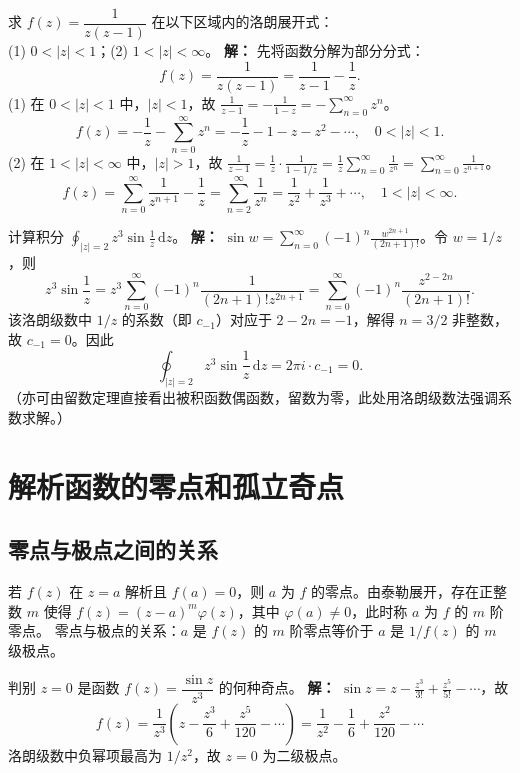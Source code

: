 \begin{tcolorbox}[title=例 3 (洛朗展开), colframe=orange!75!black, colback=orange!5!white, sharp corners]
	求 $f(z)=\dfrac{1}{z(z-1)}$ 在以下区域内的洛朗展开式：\\
	(1) $0<|z|<1$；\quad (2) $1<|z|<\infty$。
	\tcbline
	\textbf{解：} 先将函数分解为部分分式：
	\[
	f(z) = \frac{1}{z(z-1)} = \frac{1}{z-1} - \frac{1}{z}.
	\]
	(1) 在 $0<|z|<1$ 中，$|z|<1$，故 $\frac{1}{z-1} = -\frac{1}{1-z} = -\sum_{n=0}^{\infty} z^n$。
	\[
	f(z) = -\frac{1}{z} - \sum_{n=0}^{\infty} z^n = -\frac{1}{z} - 1 - z - z^2 - \cdots , \quad 0<|z|<1.
	\]
	(2) 在 $1<|z|<\infty$ 中，$|z|>1$，故 $\frac{1}{z-1} = \frac{1}{z}\cdot\frac{1}{1-1/z} = \frac{1}{z}\sum_{n=0}^{\infty} \frac{1}{z^n} = \sum_{n=0}^{\infty} \frac{1}{z^{n+1}}$。
	\[
	f(z) = \sum_{n=0}^{\infty} \frac{1}{z^{n+1}} - \frac{1}{z} = \sum_{n=2}^{\infty} \frac{1}{z^n} = \frac{1}{z^2} + \frac{1}{z^3} + \cdots , \quad 1<|z|<\infty.
	\]
\end{tcolorbox}

\begin{tcolorbox}[title=例 4 (利用洛朗级数求积分), colframe=orange!75!black, colback=orange!5!white, sharp corners]
	计算积分 $\displaystyle \oint_{|z|=2} z^3 \sin\frac{1}{z} \,\mathrm{d}z$。
	\tcbline
	\textbf{解：} $\sin w = \sum_{n=0}^{\infty} (-1)^n \frac{w^{2n+1}}{(2n+1)!}$。令 $w=1/z$，则
	\[
	z^3 \sin\frac{1}{z} = z^3 \sum_{n=0}^{\infty} (-1)^n \frac{1}{(2n+1)! z^{2n+1}} = \sum_{n=0}^{\infty} (-1)^n \frac{z^{2-2n}}{(2n+1)!}.
	\]
	该洛朗级数中 $1/z$ 的系数（即 $c_{-1}$）对应于 $2-2n=-1$，解得 $n=3/2$ 非整数，故 $c_{-1}=0$。因此
	\[
	\oint_{|z|=2} z^3 \sin\frac{1}{z} \,\mathrm{d}z = 2\pi i \cdot c_{-1} = 0.
	\]
	（亦可由留数定理直接看出被积函数偶函数，留数为零，此处用洛朗级数法强调系数求解。）
\end{tcolorbox}

\section{解析函数的零点和孤立奇点}
\subsection{零点与极点之间的关系}
若 $f(z)$ 在 $z=a$ 解析且 $f(a)=0$，则 $a$ 为 $f$ 的零点。由泰勒展开，存在正整数 $m$ 使得
$f(z) = (z-a)^m \varphi(z)$，其中 $\varphi(a)\neq 0$，此时称 $a$ 为 $f$ 的 $m$ 阶零点。
零点与极点的关系：$a$ 是 $f(z)$ 的 $m$ 阶零点等价于 $a$ 是 $1/f(z)$ 的 $m$ 级极点。

\begin{tcolorbox}[title=例 5, colframe=orange!75!black, colback=orange!5!white, sharp corners]
	判别 $z=0$ 是函数 $f(z)=\dfrac{\sin z}{z^3}$ 的何种奇点。
	\tcbline
	\textbf{解：} $\sin z = z - \frac{z^3}{3!} + \frac{z^5}{5!} - \cdots$，故
	\[
	f(z) = \frac{1}{z^3}\left( z - \frac{z^3}{6} + \frac{z^5}{120} - \cdots \right) = \frac{1}{z^2} - \frac{1}{6} + \frac{z^2}{120} - \cdots
	\]
	洛朗级数中负幂项最高为 $1/z^2$，故 $z=0$ 为二级极点。
\end{tcolorbox}
